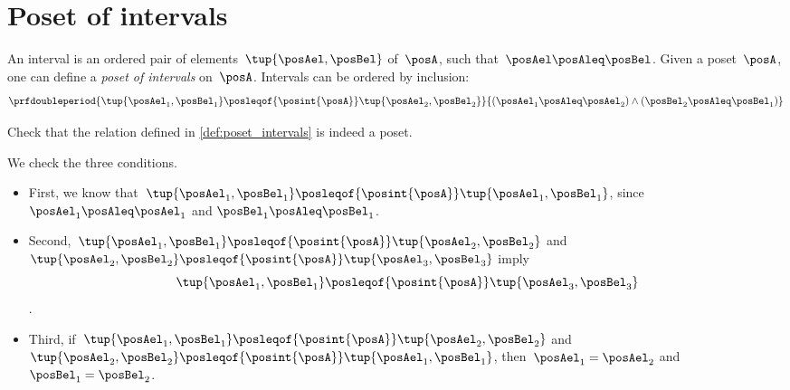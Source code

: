 
\section{Poset of intervals}
\begin{definition}
    \label{def:poset_intervals}
    An interval is an ordered pair of elements~$\tup{\posAel,\posBel}$ of~$\posA$, such that~$\posAel \posAleq \posBel$.
    Given a poset~$\posA$, one can define a \emph{poset of intervals} on~$\posA$.
    Intervals can be ordered by inclusion:
    \begin{equation}
        \prfdoubleperiod{\tup{\posAel_1,\posBel_1}\posleqof{\posint{\posA}}\tup{\posAel_2,\posBel_2} }{ (\posAel_1\posAleq \posAel_2)\wedge (\posBel_2\posAleq \posBel_1)}
    \end{equation}
\end{definition}

\begin{exercise}
    Check that the relation defined in \cref{def:poset_intervals} is indeed a poset.
\end{exercise}
\begin{solution}
    We check the three conditions.
    \begin{itemize}
        \item First, we know that~$\tup{\posAel_1,\posBel_1}\posleqof{\posint{\posA}}\tup{\posAel_1,\posBel_1}$, since $\posAel_1\posAleq \posAel_1$ and $\posBel_1\posAleq \posBel_1$.
        \item Second,~$\tup{\posAel_1,\posBel_1}\posleqof{\posint{\posA}}\tup{\posAel_2,\posBel_2}$ and $\tup{\posAel_2,\posBel_2}\posleqof{\posint{\posA}}\tup{\posAel_3,\posBel_3}$ imply $$\tup{\posAel_1,\posBel_1}\posleqof{\posint{\posA}}\tup{\posAel_3,\posBel_3}$$.
        \item Third, if~$\tup{\posAel_1,\posBel_1}\posleqof{\posint{\posA}}\tup{\posAel_2,\posBel_2}$ and $\tup{\posAel_2,\posBel_2}\posleqof{\posint{\posA}}\tup{\posAel_1,\posBel_1}$, then~$\posAel_1=\posAel_2$ and~$\posBel_1=\posBel_2$.
    \end{itemize}
\end{solution}
